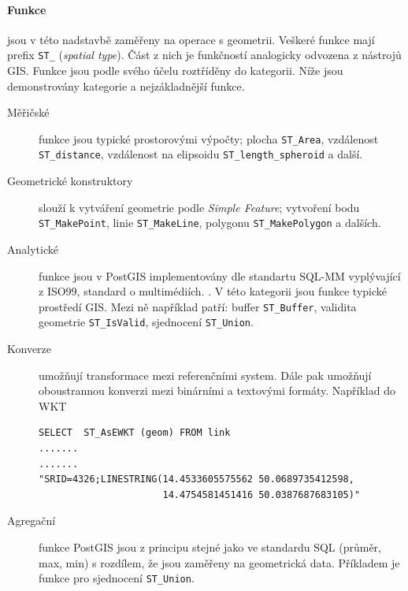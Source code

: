 \documentclass[a4paper,12pt,oneside]{report}
\begin{document}
\paragraph*{Funkce} jsou  v této nadstavbě zaměřeny na operace s geometrii. Veškeré funkce mají prefix \texttt{ST\_} (\textit{spatial type}). Část z nich je funkčností analogicky odvozena z nástrojů GIS. Funkce jsou podle svého účelu roztříděny do kategorii. Níže jsou demonstrovány  kategorie a nejzákladnější  funkce.
\begin{description}
\item[Měřičské] funkce jsou typické prostorovými výpočty; plocha \texttt{ST\_Area}, vzdálenost \texttt{ST\_distance}, vzdálenost na elipsoidu \texttt{ST\_length\_spheroid} a další. 

\item[Geometrické konstruktory] slouží k vytváření geometrie podle \textit{Simple Feature}; vytvoření bodu \texttt{ST\_MakePoint}, linie \texttt{ST\_MakeLine}, polygonu \texttt{ST\_MakePolygon} a dalších.

\item[Analytické] funkce jsou v PostGIS implementovány dle standartu SQL-MM  vyplývající z ISO99, standard o multimédiích. 				\cite{sqlmm}. V této kategorii jsou funkce typické prostředí GIS. Mezi ně například patří: buffer \texttt{ST\_Buffer}, validita geometrie \texttt{ST\_IsValid}, sjednocení \texttt{ST\_Union}.

\item[Konverze] umožňují transformace mezi referenčními system. Dále pak umožňují oboustrannou konverzi mezi binárními a textovými formáty. Například do \acs{WKT} 

\begin{verbatim}
SELECT  ST_AsEWKT (geom) FROM link
.......
.......
"SRID=4326;LINESTRING(14.4533605575562 50.0689735412598,
                      14.4754581451416 50.0387687683105)"
\end{verbatim}

\item[Agregační] funkce PostGIS jsou z principu  stejné jako ve standardu SQL (průměr, max, min) s rozdílem, že jsou zaměřeny na geometrická data. Příkladem je funkce pro sjednocení \texttt{ST\_Union}.
\end{description}
\end{document}
